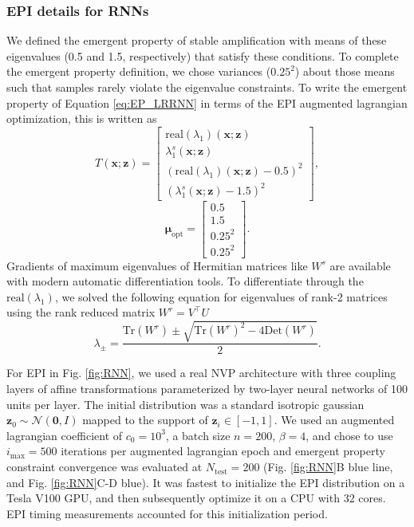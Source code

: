 \documentclass[11pt]{article}
\begin{document}
\subsubsection{EPI details for RNNs}
We defined the emergent property of stable amplification with means of these eigenvalues (0.5 and 1.5, respectively) that satisfy these conditions.
To complete the emergent property definition, we chose variances ($0.25^2$) about those means such that samples rarely violate the eigenvalue constraints.
To write the emergent property of Equation \ref{eq:EP_LRRNN} in terms of the EPI augmented lagrangian optimization, this is written as
\begin{equation} 
T(\mathbf{x}; \mathbf{z}) = \begin{bmatrix} \text{real}(\lambda_1)(\mathbf{x}; \mathbf{z}) \\ \lambda_1^s(\mathbf{x}; \mathbf{z}) \\ \left(\text{real}(\lambda_1)(\mathbf{x}; \mathbf{z}) - 0.5 \right)^2 \\ \left( \lambda_1^s(\mathbf{x}; \mathbf{z})  - 1.5 \right)^2 \end{bmatrix},
\end{equation}
\begin{equation} 
\bm{\mu}_{\text{opt}} = \begin{bmatrix} 0.5 \\ 1.5 \\ 0.25^2 \\ 0.25^2 \end{bmatrix}.
\end{equation}
Gradients of maximum eigenvalues of Hermitian matrices like $W^s$ are available with modern automatic differentiation tools.
To differentiate through the $\text{real}(\lambda_1)$, we solved the following equation for eigenvalues of rank-2 matrices using the rank reduced matrix $W^r = V^{\top} U$
\begin{equation}
\lambda_{\pm} = \frac{\text{Tr}(W^r) \pm \sqrt{\text{Tr}(W^r)^2 - 4\text{Det}(W^r)}}{2}.
\end{equation}

For EPI in Fig. \ref{fig:RNN}, we used a real NVP architecture with three coupling layers of affine transformations parameterized by two-layer neural networks of 100 units per layer.
The initial distribution was a standard isotropic gaussian $\mathbf{z}_0 \sim \mathcal{N}(\mathbf{0}, I)$ mapped to the support of $\mathbf{z}_i \in [-1, 1]$. 
We used an augmented lagrangian coefficient of $c_0 = 10^{3}$, a batch size $n=200$, $\beta=4$, and chose to use $i_{\text{max}} = 500$ iterations per augmented lagrangian epoch and emergent property constraint convergence was evaluated at $N_{\text{test}} = 200$ (Fig. \ref{fig:RNN}B blue line, and Fig. \ref{fig:RNN}C-D blue).
It was fastest to initialize the EPI distribution on a Tesla V100 GPU, and then subsequently optimize it on a CPU with 32 cores.
EPI timing measurements accounted for this initialization period.
\end{document}
